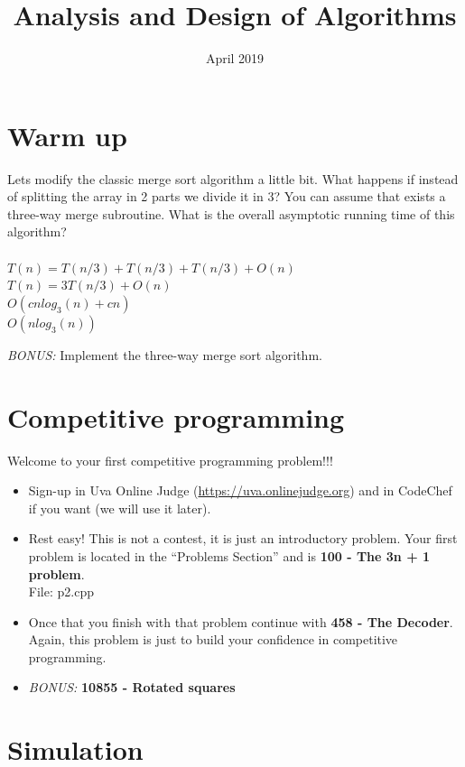 \documentclass[12pt]{article}
\title{Analysis and Design of Algorithms}
\author{}
\date{April 2019}
\begin{document}
\maketitle

\section{Warm up}

Lets modify the classic merge sort algorithm a little bit. What happens if instead of splitting the array in 2 parts we divide it in 3? You can assume that exists a three-way merge subroutine. What is the overall asymptotic running time of this algorithm?
\\ \\
$T(n)=T(n/3)+T(n/3)+T(n/3)+O(n)$ \\
$T(n)=3T(n/3)+O(n)$
\\
$O( cn{log_3 (n)}+cn )$ \\
$O(nlog_3 (n))$

\emph{BONUS:} Implement the three-way merge sort algorithm.

\section{Competitive programming}

Welcome to your first competitive programming problem!!! 

\begin{itemize}
    \item Sign-up in Uva Online Judge (\url{https://uva.onlinejudge.org}) and in CodeChef if you want (we will use it later).
    \item Rest easy! This is not a contest, it is just an introductory problem. Your first problem is located in the ``Problems Section'' and is \textbf{100 - The 3n + 1 problem}.\\
    File: p2.cpp
    
    \item Once that you finish with that problem continue with \textbf{458 - The Decoder}. Again, this problem is just to build your confidence in competitive programming.
    
    \item \emph{BONUS:} \textbf{10855 - Rotated squares}
    
\end{itemize}

\section{Simulation}
\end{document}
